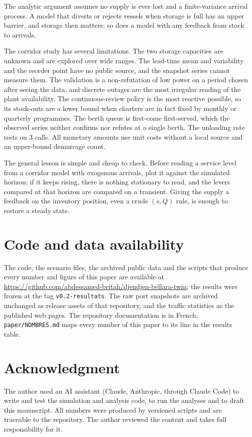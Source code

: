 \documentclass[conference]{IEEEtran}   %
\begin{document}
The analytic argument assumes no supply is ever lost and a finite-variance arrival
process. A model that diverts or rejects vessels when storage is full has an upper barrier,
and storage then matters; so does a model with any feedback from stock to arrivals.

The corridor study has several limitations. The two storage capacities are unknown and are
explored over wide ranges. The lead-time mean and variability and the reorder point have no
public source, and the snapshot series cannot measure them. The validation is a
non-refutation of low power on a period chosen after seeing the data, and discrete outages
are the most irregular reading of the plant availability. The continuous-review policy is
the most reactive possible, so its stock-outs are a lower bound when charters are in fact
fixed by monthly or quarterly programmes. The berth queue is first-come first-served, which
the observed series neither confirms nor refutes at a single berth. The unloading rate rests
on 3 calls. All monetary amounts use unit costs without a local source and an upper-bound
demurrage count.

The general lesson is simple and cheap to check. Before reading a service level from a
corridor model with exogenous arrivals, plot it against the simulated horizon: if it keeps
rising, there is nothing stationary to read, and the levers compared at that horizon are
compared on a transient. Giving the supply a feedback on the inventory position, even a
crude $(s,Q)$ rule, is enough to restore a steady state.

\section*{Code and data availability}
The code, the scenario files, the archived public data and the scripts that produce every
number and figure of this paper are available at
\url{https://github.com/abdessamed-britah/djendjen-bellara-twin}; the results were frozen at
the tag \texttt{v0.2-resultats}. The raw port snapshots are archived unchanged as release
assets of that repository, and the traffic statistics as the published web pages. The
repository documentation is in French; \texttt{paper/NOMBRES.md} maps every number of this
paper to its line in the results table.

\section*{Acknowledgment}
The author used an AI assistant (Claude, Anthropic, through Claude Code) to write and test
the simulation and analysis code, to run the analyses and to draft this manuscript. All
numbers were produced by versioned scripts and are traceable to the repository. The author
reviewed the content and takes full responsibility for it.



\end{document}
